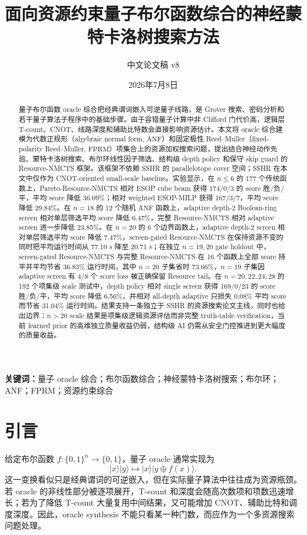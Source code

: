 \documentclass[UTF8,fontset=macnew,11pt]{ctexart}
\title{面向资源约束量子布尔函数综合的神经蒙特卡洛树搜索方法}
\author{中文论文稿 v8}
\date{2026年7月8日}
\newcommand{\method}{Resource-NMCTS}
\newcommand{\pareto}{Pareto-Resource-NMCTS}
\newcommand{\screen}{Boolean-ring screen}
\newcommand{\anf}{\ensuremath{\mathrm{ANF}}}
\newcommand{\fprm}{\ensuremath{\mathrm{FPRM}}}
\newcommand{\xor}{\ensuremath{\oplus}}
\begin{document}
\pagestyle{plain}
\maketitle

\begin{abstract}
量子布尔函数 oracle 综合把经典谓词嵌入可逆量子线路，是 Grover 搜索、密码分析和若干量子算法子程序中的基础步骤。由于容错量子计算中非 Clifford 门代价高，逻辑层 T-count、CNOT、线路深度和辅助比特数会直接影响资源估计。本文将 oracle 综合建模为代数正规形（algebraic normal form, \anf{}）和固定极性 Reed--Muller（fixed-polarity Reed--Muller, \fprm{}）项集合上的资源加权搜索问题，提出结合神经动作先验、蒙特卡洛树搜索、布尔环线性因子筛选、结构级 depth policy 和保守 skip guard 的 \method{} 框架。该框架不依赖 SSHR 的 parallelotope cover 空间；SSHR 在本文中仅作为 CNOT-oriented small-scale baseline。实验显示，在 $n\leq6$ 的 177 个传统函数上，\pareto{} 相对 ESOP cube beam 获得 174/0/3 的 score 胜/负/平，平均 score 降低 36.09\%；相对 weighted ESOP-MILP 获得 167/3/7，平均 score 降低 29.84\%。在 $n=18$ 的 12 个随机 \anf{} 函数上，adaptive depth-2 \screen{} 相对单层筛选平均 score 降低 6.47\%，完整 \method{} 相对 adaptive screen 进一步降低 23.85\%。在 $n=20$ 的 6 个边界函数上，adaptive depth-2 screen 相对单层筛选平均 score 降低 7.47\%，screen-gated \method{} 在保持资源不变的同时把平均运行时间从 77.10 s 降至 20.71 s；在独立 $n=19,20$ gate holdout 中，screen-gated \method{} 与完整 \method{} 在 16 个函数上全部 score 持平并平均节省 36.83\% 运行时间，其中 $n=20$ 子集省时 73.66\%，$n=19$ 子集因 adaptive screen 有 4/8 个 score loss 被正确保留 Resource tail。在 $n=20,22,24,28$ 的 192 个项集级 scale 测试中，depth policy 相对 single screen 获得 169/0/23 的 score 胜/负/平，平均 score 降低 6.56\%，并相对 all-depth adaptive 只损失 0.08\% 平均 score 而节省 31.04\% 运行时间。结果支持一条独立于 SSHR 的资源搜索论文主线，同时也给出边界：$n>20$ scale 结果是项集级逻辑资源评估而非完整 truth-table verification，当前 learned prior 的高维独立质量收益仍弱，结构级 AI 仍需从安全门控推进到更大幅度的质量收益。
\end{abstract}

\noindent\textbf{关键词：}量子 oracle 综合；布尔函数综合；神经蒙特卡洛树搜索；布尔环；ANF；FPRM；资源约束综合

\section{引言}

给定布尔函数 $f:\{0,1\}^n\rightarrow\{0,1\}$，量子 oracle 通常实现为
\begin{equation}
  |x\rangle |y\rangle \mapsto |x\rangle |y\xor f(x)\rangle .
  \label{eq:oracle}
\end{equation}
这一变换看似只是经典谓词的可逆嵌入，但在实际量子算法中往往成为资源瓶颈。若 oracle 的非线性部分被逐项展开，T-count 和深度会随高次数项和项数迅速增长；若为了降低 T-count 大量复用中间结果，又可能增加 CNOT、辅助比特和调度深度。因此，oracle synthesis 不能只看某一种门数，而应作为一个多资源搜索问题处理。
\end{document}
